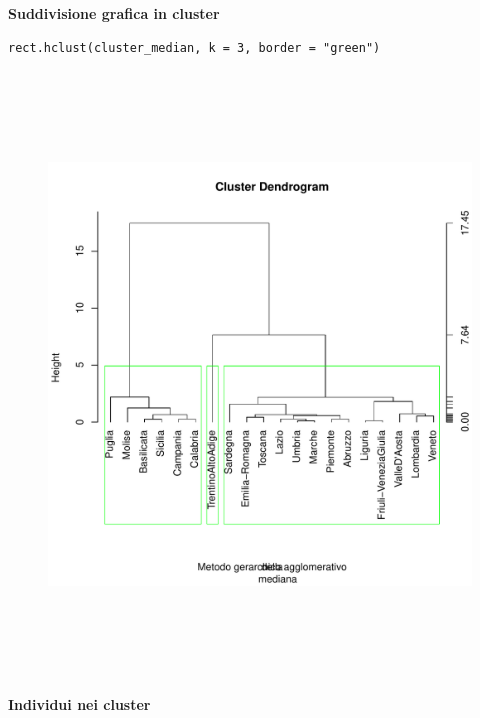 \noindent \textbf{Suddivisione grafica in cluster}

\vspace{5mm}
\begin{lstlisting}
rect.hclust(cluster_median, k = 3, border = "green")
\end{lstlisting}
\vspace{5mm}

\vspace{5mm}
\begin{figure}[!htbp]
    \centering
    \includegraphics[height=16cm]{ProgettoSAD/capitoli/images/clustering/dendro_clmediana_sudd.pdf}
\end{figure}
\vspace{5mm}

\noindent \textbf{Individui nei cluster}

